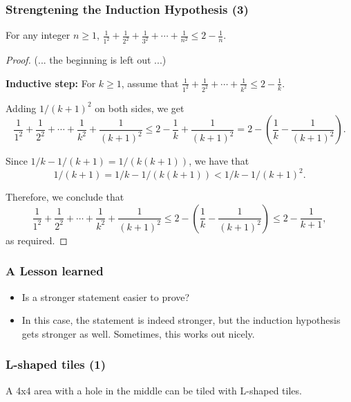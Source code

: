 \begin{frame}\frametitle{Strengtening the Induction Hypothesis (3)}
  \begin{theorem}
    For any integer $n\geq 1$, $\frac{1}{1^2} + \frac{1}{2^2} + \frac{1}{3^2} + \cdots +\frac{1}{n^2} \leq 2 - \frac{1}{n}$.
  \end{theorem}
  \pause
  \begin{proof}
    {\footnotesize
      (... the beginning is left out ...)
      
      {\bf Inductive step:} For $k\geq 1$, assume that $ \frac{1}{1^2} + \frac{1}{2^2}  + \cdots +\frac{1}{k^2} \leq 2 - \frac{1}{k}. $
      
      Adding $1/(k+1)^2$ on both sides, we get
      \[ \frac{1}{1^2} + \frac{1}{2^2}  + \cdots +\frac{1}{k^2}+\frac{1}{(k+1)^2}
      \leq 2 - \frac{1}{k} +\frac{1}{(k+1)^2}
      = 2 - \left(\frac{1}{k} - \frac{1}{(k+1)^2}\right).\]

     Since $1/k - 1/(k+1) = 1/(k(k+1))$, we have that
      \[1/(k+1) = 1/k - 1/(k(k+1)) < 1/k - 1/(k+1)^2.\]

      Therefore, we conclude that
      \[
      \frac{1}{1^2} + \frac{1}{2^2} + \cdots +\frac{1}{k^2}+\frac{1}{(k+1)^2}
      \leq 2 - \left(\frac{1}{k} - \frac{1}{(k+1)^2}\right)
      \leq 2 - \frac{1}{k+1},
      \]
      as required.
    }
  \end{proof}
\end{frame}

\begin{frame}\frametitle{A Lesson learned}
  \begin{itemize}
  \item
    Is a stronger statement easier to prove?
    \pause
  \item
    In this case, the statement is indeed stronger, but the induction
    hypothesis gets stronger as well.  Sometimes, this works out
    nicely.
  \end{itemize}
\end{frame}

\begin{frame}\frametitle{L-shaped tiles (1)}
  A 4x4 area with a hole in the middle can be tiled with L-shaped tiles.

  \vspace{0.2in}
  
\end{frame}


